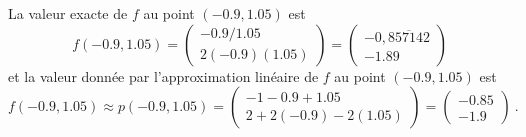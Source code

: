 { La valeur exacte de $f$ au point $(-0.9, 1.05)$ est
\[
f(-0.9, 1.05) =
\begin{pmatrix}
-0.9/1.05 \\ 2(-0.9)(1.05)
\end{pmatrix}
=
\begin{pmatrix}
-0,\overline{857142} \\ -1.89
\end{pmatrix}
\]
et la valeur donnée par l'approximation linéaire de $f$
au point $(-0.9, 1.05)$ est
\[
f(-0.9, 1.05) \approx p(-0.9, 1.05) =
\begin{pmatrix}
-1 -0.9 +1.05 \\ 2 + 2(-0.9) - 2(1.05)
\end{pmatrix}
=
\begin{pmatrix}
-0.85 \\ -1.9
\end{pmatrix} \ .
\]
}

